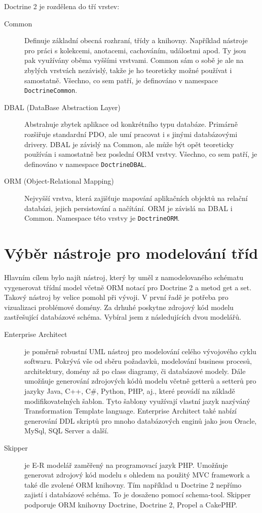 \documentclass[thesis=B,czech]{FITthesis}[2012/06/26]
\begin{document}
	\newpage
	Doctrine 2 je rozdělena do tří vrstev:
	\begin{description}
		\item[Common] Definuje základní obecná rozhraní, třídy a knihovny. Například nástroje pro práci s kolekcemi, anotacemi, cachováním, událostmi apod. Ty jsou pak využívány oběma vyššími vrstvami. Common sám o sobě je ale na zbylých vrstvách nezávislý, takže je ho teoreticky možné používat i samostatně. Všechno, co sem patří, je definováno v namespace \verb|DoctrineCommon|.
		\item[DBAL (DataBase Abstraction Layer)] Abstrahuje zbytek aplikace od konkrétního typu databáze. Primárně rozšiřuje standardní PDO, ale umí pracovat i s jinými databázovými drivery. DBAL je závislý na Common, ale může být opět teoreticky používán i samostatně bez poslední ORM vrstvy. Všechno, co sem patří, je definováno v namespace \verb|DoctrineDBAL|.
		\item[ORM (Object-Relational Mapping)] Nejvyšší vrstva, která zajišťuje mapování aplikačních objektů na relační databázi, jejich persistování a načítání. ORM je závislá na DBAL i Common. Namespace této vrstvy je \verb|DoctrineORM|.\cite{doctrine2}
	\end{description}

\section{Výběr nástroje pro modelování tříd}
	Hlavním cílem bylo najít nástroj, který by uměl z namodelovaného schématu vygenerovat třídní model včetně ORM notací pro Doctrine 2 a metod get a set. Takový nástroj by velice pomohl při vývoji. V první řadě je potřeba pro vizualizaci problémové domény. Za drhuhé poskytne zdrojový kód modelu zastřešující databázové schéma. Vybíral jsem z následujících dvou modelářů.

\begin{description}
	\item[Enterprise Architect]
	je poměrně robustní UML nástroj pro modelování celého vývojového cyklu softwaru. Pokrývá vše od sběru požadavků, modelování business procesů, architektury, domény až po class diagramy, či databázové modely. Dále umožňuje generování zdrojových kódů modelu včetně getterů a setterů pro jazyky Java, C++, C\#, Python, PHP, aj., které provádí na základě modifikovatelných šablon. Tyto šablony využívají vlastní jazyk nazýváný Transformation Template language. Enterprise Architect také nabízí generování DDL skriptů pro mnoho databázových enginů jako jsou Oracle, MySql, SQL Server a další.

	\item[Skipper]
	je E-R modelář zaměřený na programovací jazyk PHP. Umožňuje generovat zdrojový kód modelu s ohledem na použitý MVC framework a také dle zvolené ORM knihovny. Tím například u Doctrine 2 nepřímo zajistí i databázové schéma. To je dosaženo pomocí schema-tool. Skipper podporuje ORM knihovny Doctrine, Doctrine 2, Propel a CakePHP.
\end{description}
\end{document}
